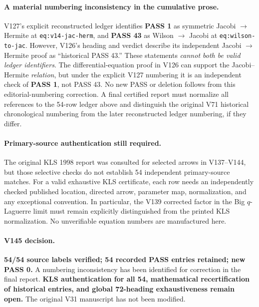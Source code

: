 \documentclass[11pt]{article}
\begin{document}
\paragraph{A material numbering inconsistency in the cumulative prose.} V127's explicit reconstructed ledger identifies \textbf{PASS 1} as symmetric Jacobi $\to$ Hermite at \texttt{eq:v14-jac-herm}, and \textbf{PASS 43} as Wilson $\to$ Jacobi at \texttt{eq:wilson-to-jac}. However, V126's heading and verdict describe its independent Jacobi $\to$ Hermite proof as ``historical PASS 43.'' These statements \emph{cannot both be valid ledger identifiers}. The differential-equation proof in V126 can support the Jacobi--Hermite \emph{relation}, but under the explicit V127 numbering it is an independent check of \textbf{PASS 1}, not PASS 43. No new PASS or deletion follows from this editorial-numbering correction. A final certified report must normalize all references to the 54-row ledger above and distinguish the original V71 historical chronological numbering from the later reconstructed ledger numbering, if they differ.

\paragraph{Primary-source authentication still required.} The original KLS 1998 report was consulted for selected arrows in V137--V144, but those selective checks do not establish 54 independent primary-source matches. For a valid exhaustive KLS certificate, each row needs an independently checked published location, directed arrow, parameter map, normalization, and any exceptional convention. In particular, the V139 corrected factor in the Big $q$-Laguerre limit must remain explicitly distinguished from the printed KLS normalization. No unverifiable equation numbers are manufactured here.

\paragraph{V145 decision.} \textbf{54/54 source labels verified; 54 recorded PASS entries retained; new PASS 0.} A numbering inconsistency has been identified for correction in the final report. \textbf{KLS authentication for all 54, mathematical recertification of historical entries, and global 72-heading exhaustiveness remain open.} The original V31 manuscript has not been modified.


\clearpage
\end{document}
